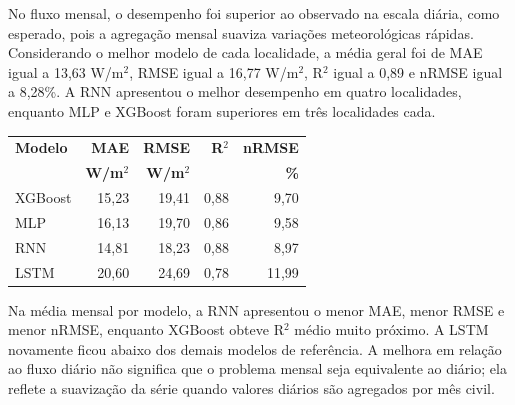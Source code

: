 \documentclass[12pt,a4paper]{article}
\begin{document}
No fluxo mensal, o desempenho foi superior ao observado na escala diária, como esperado, pois a agregação mensal suaviza variações meteorológicas rápidas. Considerando o melhor modelo de cada localidade, a média geral foi de MAE igual a 13,63 W/m$^2$, RMSE igual a 16,77 W/m$^2$, R$^2$ igual a 0,89 e nRMSE igual a 8,28\%. A RNN apresentou o melhor desempenho em quatro localidades, enquanto MLP e XGBoost foram superiores em três localidades cada.

\vspace{6pt}

\begin{center}
\small
\begin{tabular}{lrrrr}
\toprule
\textbf{Modelo} & \textbf{MAE} & \textbf{RMSE} & \textbf{R$^2$} & \textbf{nRMSE} \\
 & \textbf{W/m$^2$} & \textbf{W/m$^2$} & & \textbf{\%} \\
\midrule
XGBoost & 15,23 & 19,41 & 0,88 & 9,70 \\
MLP & 16,13 & 19,70 & 0,86 & 9,58 \\
RNN & 14,81 & 18,23 & 0,88 & 8,97 \\
LSTM & 20,60 & 24,69 & 0,78 & 11,99 \\
\bottomrule
\end{tabular}
\end{center}

\vspace{6pt}

Na média mensal por modelo, a RNN apresentou o menor MAE, menor RMSE e menor nRMSE, enquanto XGBoost obteve R$^2$ médio muito próximo. A LSTM novamente ficou abaixo dos demais modelos de referência. A melhora em relação ao fluxo diário não significa que o problema mensal seja equivalente ao diário; ela reflete a suavização da série quando valores diários são agregados por mês civil.

\vspace{6pt}
\end{document}
